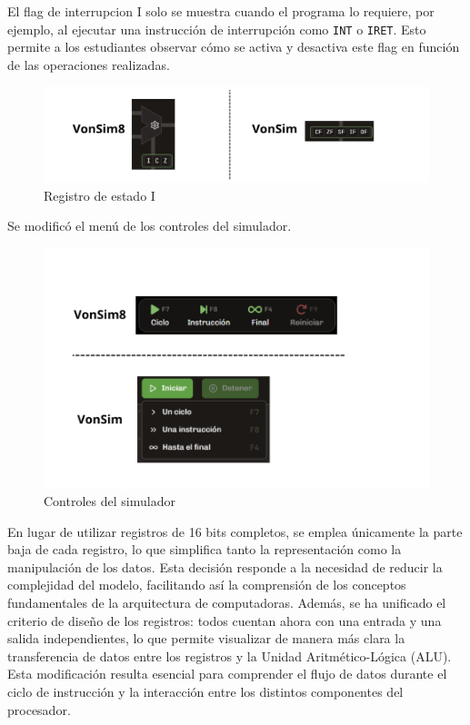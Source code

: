 \documentclass[12pt,oneside]{templates/unerthesis}
\begin{document}
El flag de interrupcion I solo se muestra cuando el programa lo requiere, por ejemplo, al ejecutar una instrucción de interrupción como \texttt{INT} o \texttt{IRET}. Esto permite a los estudiantes observar cómo se activa y desactiva este flag en función de las operaciones realizadas.

\begin{figure}

{\centering \includegraphics[width=0.85\linewidth]{images/flagi} 

}

\caption{Registro de estado I}\label{fig:banderaI}
\end{figure}

Se modificó el menú de los controles del simulador.

\begin{figure}

{\centering \includegraphics[width=0.85\linewidth]{images/controles} 

}

\caption{Controles del simulador}\label{fig:controles}
\end{figure}

En lugar de utilizar registros de 16 bits completos, se emplea únicamente la parte baja de cada registro, lo que simplifica tanto la representación como la manipulación de los datos. Esta decisión responde a la necesidad de reducir la complejidad del modelo, facilitando así la comprensión de los conceptos fundamentales de la arquitectura de computadoras. Además, se ha unificado el criterio de diseño de los registros: todos cuentan ahora con una entrada y una salida independientes, lo que permite visualizar de manera más clara la transferencia de datos entre los registros y la Unidad Aritmético-Lógica (ALU). Esta modificación resulta esencial para comprender el flujo de datos durante el ciclo de instrucción y la interacción entre los distintos componentes del procesador.
\end{document}
